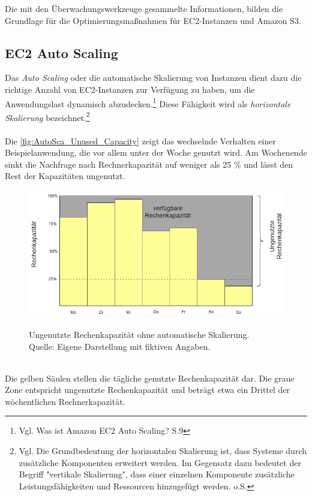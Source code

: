 Die mit den Überwachungswerkzeuge gesammelte Informationen, bilden die Grundlage für die Optimierungsmaßnahmen für EC2-Instanzen und Amazon S3.

\subsection{EC2 Auto Scaling}
Das \textit{Auto Scaling} oder die automatische Skalierung von Instanzen dient dazu die richtige Anzahl von EC2-Instanzen zur Verfügung zu haben, um die Anwendungslast dynamisch abzudecken.\footnote{Vgl. Was ist Amazon EC2 Auto Scaling? S.9\cite{AMZ31} } Diese Fähigkeit wird als \textit{horizontale Skalierung} bezeichnet.\footnote{Vgl. Die Grundbedeutung der horizontalen Skalierung ist, dass Systeme durch zusätzliche Komponenten erweitert werden. Im Gegensatz dazu bedeutet der Begriff "vertikale Skalierung", dass einer einzelnen Komponente zusätzliche Leistungsfähigkeiten und Ressourcen hinzugefügt werden. o.S.\cite{TECH1} }
\\\\
Die \autoref{fig:AutoSca_Unused_Capacity} zeigt das wechselnde Verhalten einer Beispielanwendung, die vor allem unter der Woche genutzt wird. Am Wochenende sinkt die Nachfrage nach Rechnerkapazität auf weniger als 25 \% und lässt den Rest der Kapazitäten ungenutzt. 
\begin{figure}[h]
    \centering
    \includegraphics[scale=0.5]{sources/AutoCap Unused Capacity}
    \caption[Ungenutzte Rechenkapazität ohne automatische Skalierung]{}
    \label{fig:AutoSca_Unused_Capacity} Ungenutzte Rechenkapazität ohne automatische Skalierung. \\
    Quelle: Eigene Darstellung mit fiktiven Angaben. 
  \end{figure}\\
Die gelben Säulen stellen die tägliche genutzte Rechenkapazität dar.
Die graue Zone entspricht ungenutzte Rechenkapazität und beträgt etwa ein Drittel der wöchentlichen Rechnerkapazität.
